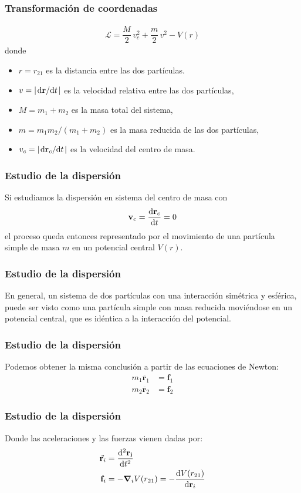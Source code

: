 \begin{frame}[fragile]
\frametitle{Transformación de coordenadas}
\begin{align}
\mathcal{L} = \dfrac{M}{2} \, v_{c}^{2} + \dfrac{m}{2} \, v^{2} - V(r)
\end{align}
donde
\fontsize{12}{12}\selectfont
\begin{itemize}[<+->]
\item [\textcolor{red}{\checkmark}] $r = r_{21}$ es la distancia entre las dos partículas.
\item [\textcolor{red}{\checkmark}] $v = \abs{\dv*{\mathbf{r}}{t}}$ es la velocidad relativa entre las dos partículas,
\item [\textcolor{red}{\checkmark}] $M = m_{1} + m_{2}$ es la masa total del sistema,
\item [\textcolor{red}{\checkmark}] $m = m_{1}m_{2}/(m_{1} + m_{2})$ es la masa reducida de las dos partículas,
\item [\textcolor{red}{\checkmark}] $v_{c} = \abs{\dv*{\mathbf{r}_{c}}{t}}$ es la velocidad del centro de masa.
\end{itemize}
\end{frame}
\begin{frame}
\frametitle{Estudio de la dispersión}
Si estudiamos la dispersión en sistema del centro de masa con 
\begin{align*}
\mathbf{v}_{c} = \dv{\mathbf{r}_{c}}{t} = 0
\end{align*}
el proceso queda entonces representado por el movimiento de una partícula simple de masa $m$ en un potencial central $V(r)$.
\end{frame}
\begin{frame}
\frametitle{Estudio de la dispersión}
En general, un sistema de dos partículas con una interacción simétrica y esférica, puede ser visto como una partícula simple con masa reducida moviéndose en un potencial central, que es idéntica a la interacción del potencial.
\end{frame}
\begin{frame}
\frametitle{Estudio de la dispersión}
Podemos obtener la misma conclusión a partir de las ecuaciones de Newton:
\begin{align*}
m_{1} \ddot{\mathbf{r}_{1}} &= \mathbf{f}_{1} \\
m_{2} \ddot{\mathbf{r}_{2}} &= \mathbf{f}_{2} 
\end{align*}
\end{frame}
\begin{frame}
\frametitle{Estudio de la dispersión}
Donde las aceleraciones y las fuerzas vienen dadas por:
\begin{align*}
\ddot{\mathbf{r}_{i}} &= \dv[2]{\mathbf{r_{i}}}{t} \\
\mathbf{f}_{i} &= - \gradient_{i} V(r_{21}) = - \dv{V(r_{21})}{\mathbf{r}_{i}}
\end{align*}
\end{frame}
